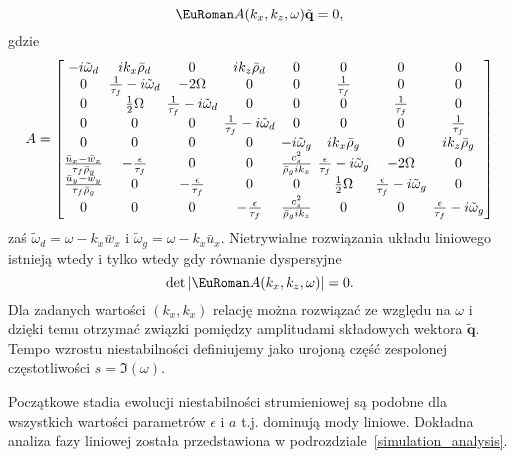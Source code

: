 \begin{equation}
 \eurom{A}(k_x,k_z,\omega)\tilde{\mathbf{q}} = 0,
 \label{eq:linset}
\end{equation}
gdzie 
\begin{equation}
 A =
 \setlength\arraycolsep{2pt}
 \begin{bmatrix}
    -i\tilde{\omega}_d & i k_x \bar{\rho}_d & 0 & i k_z \bar{\rho}_d & 0 & 0 & 0 & 0 \\
    0 & \frac{1}{\tau_f} -i \tilde{\omega}_d & -2\Omega & 0 & 0 & \frac{1}{\tau_f} & 0 & 0 \\
    0 & \frac{1}{2}\Omega & \frac{1}{\tau_f} -i \tilde{\omega}_d & 0 & 0 & 0 & \frac{1}{\tau_f} & 0 \\
    0 & 0 & 0 & \frac{1}{\tau_f} -i \tilde{\omega}_d & 0 & 0 & 0 & \frac{1}{\tau_f} \\
    0 & 0 & 0 & 0 & -i\tilde{\omega}_g & i k_x \bar{\rho}_g & 0 & i k_z \bar{\rho}_g \\
    \frac{\bar{u}_x - \bar{w}_x}{\tau_f \bar{\rho}_g} & -\frac{\epsilon}{\tau_f} & 0 & 0 &
    \frac{c_s^2}{\bar{\rho}_g i k_x} & \frac{\epsilon}{\tau_f}-i\tilde{\omega}_g &
    -2\Omega & 0\\
    \frac{\bar{u}_y - \bar{w}_y}{\tau_f \bar{\rho}_g} & 0 & -\frac{\epsilon}{\tau_f} & 0 & 0 &
    \frac{1}{2}\Omega & \frac{\epsilon}{\tau_f} -i \tilde{\omega}_g & 0 \\
    0 & 0 & 0 & -\frac{\epsilon}{\tau_f} & \frac{c_s^2}{\bar{\rho}_g i k_z} & 0 & 0 &
    \frac{\epsilon}{\tau_f} -i \tilde{\omega}_g
 \end{bmatrix}
%
\end{equation}
zaś $\tilde{\omega}_d = \omega - k_x \bar{w}_x$ i $\tilde{\omega}_g = \omega -
k_x \bar{u}_x$.
%
Nietrywialne rozwiązania układu liniowego  istnieją wtedy i tylko
wtedy gdy równanie dyspersyjne 
\begin{equation}
 \det|\eurom{A}(k_x,k_z,\omega)|=0.
 \label{eq:disprel}
\end{equation}
%
Dla zadanych wartości $(k_x, k_x)$ relację  można rozwiązać ze
względu na $\omega$ i dzięki temu otrzymać związki pomiędzy amplitudami
składowych wektora $\tilde{\mathbf{q}}$.
Tempo wzrostu niestabilności definiujemy jako urojoną część zespolonej
częstotliwości $s=\Im(\omega)$.
%

Początkowe stadia ewolucji niestabilności strumieniowej są podobne dla
wszystkich wartości parametrów $\epsilon$ i $a$ t.j. dominują mody liniowe.
Dokładna analiza fazy liniowej została przedstawiona w
podrozdziale~\ref{simulation_analysis}.
